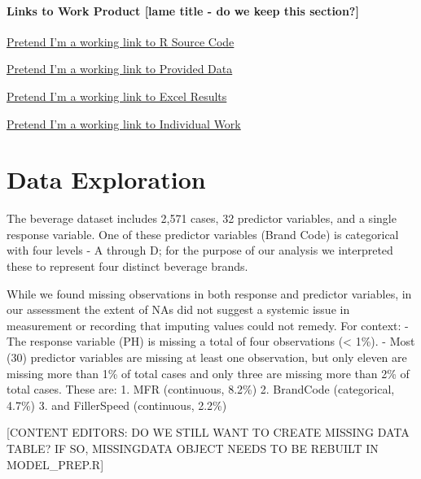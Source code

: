 \documentclass[]{report}
\begin{document}
\hypertarget{links-to-work-product-lame-title---do-we-keep-this-section}{%
\subsubsection{Links to Work Product {[}lame title - do we keep this
section?{]}}\label{links-to-work-product-lame-title---do-we-keep-this-section}}

\begin{compactitem}
  \item \href{https://github.com/JeremyOBrien16/CUNY_DATA_624/tree/master/Project_Two}{Pretend I'm a working link to R Source Code}
  \item \href{https://github.com/JeremyOBrien16/CUNY_DATA_624/tree/master/Project_Two}{Pretend I'm a working link to Provided Data}
  \item \href{https://github.com/JeremyOBrien16/CUNY_DATA_624/tree/master/Project_Two}{Pretend I'm a working link to Excel Results}
  \item \href{https://github.com/JeremyOBrien16/CUNY_DATA_624/tree/master/Project_Two}{Pretend I'm a working link to Individual Work}
\end{compactitem}

\hypertarget{data-exploration}{%
\chapter{Data Exploration}\label{data-exploration}}

The beverage dataset includes 2,571 cases, 32 predictor variables, and a
single response variable. One of these predictor variables (Brand Code)
is categorical with four levels - A through D; for the purpose of our
analysis we interpreted these to represent four distinct beverage
brands.

While we found missing observations in both response and predictor
variables, in our assessment the extent of NAs did not suggest a
systemic issue in measurement or recording that imputing values could
not remedy. For context: - The response variable (PH) is missing a total
of four observations (\textless{} 1\%). - Most (30) predictor variables
are missing at least one observation, but only eleven are missing more
than 1\% of total cases and only three are missing more than 2\% of
total cases. These are: 1. MFR (continuous, 8.2\%) 2. BrandCode
(categorical, 4.7\%) 3. and FillerSpeed (continuous, 2.2\%)

{[}CONTENT EDITORS: DO WE STILL WANT TO CREATE MISSING DATA TABLE? IF
SO, MISSINGDATA OBJECT NEEDS TO BE REBUILT IN MODEL\_PREP.R{]}
\end{document}
